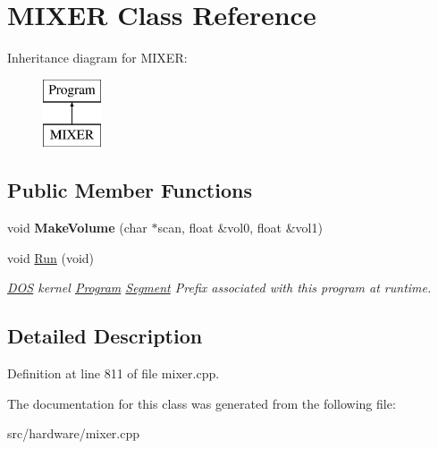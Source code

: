 \hypertarget{classMIXER}{\section{M\-I\-X\-E\-R Class Reference}
\label{classMIXER}
}
Inheritance diagram for M\-I\-X\-E\-R\-:\begin{figure}[H]
\begin{center}
\leavevmode
\includegraphics[height=2.000000cm]{classMIXER}
\end{center}
\end{figure}
\subsection*{Public Member Functions}
\begin{DoxyCompactItemize}
\item 
\hypertarget{classMIXER_a85b8e090dc7b9a2c6d3fdf0935e7f824}{void {\bfseries Make\-Volume} (char $\ast$scan, float \&vol0, float \&vol1)}\label{classMIXER_a85b8e090dc7b9a2c6d3fdf0935e7f824}

\item 
\hypertarget{classMIXER_a5043b553511d83536361a96111c17a31}{void \hyperlink{classMIXER_a5043b553511d83536361a96111c17a31}{Run} (void)}\label{classMIXER_a5043b553511d83536361a96111c17a31}

\begin{DoxyCompactList}\small\item\em \hyperlink{classDOS}{D\-O\-S} kernel \hyperlink{classProgram}{Program} \hyperlink{structSegment}{Segment} Prefix associated with this program at runtime. \end{DoxyCompactList}\end{DoxyCompactItemize}


\subsection{Detailed Description}


Definition at line 811 of file mixer.\-cpp.



The documentation for this class was generated from the following file\-:\begin{DoxyCompactItemize}
\item 
src/hardware/mixer.\-cpp\end{DoxyCompactItemize}
